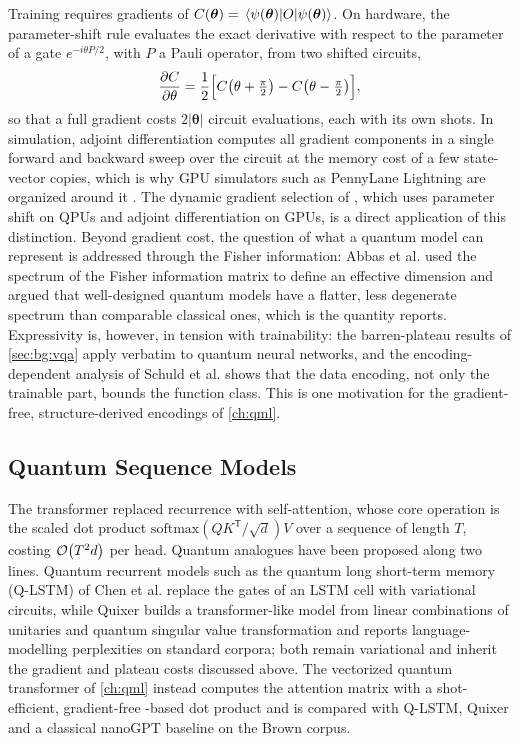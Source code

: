 Training requires gradients of $C(\bm{\theta})=\expval{O}{\psi(\bm{\theta})}$. On hardware, the parameter-shift rule \cite{crooks2019parametershift} evaluates the exact derivative with respect to the parameter of a gate $e^{-i\theta P/2}$, with $P$ a Pauli operator, from two shifted circuits,
\begin{equation}\label{eq:bg:paramshift}
\frac{\partial C}{\partial\theta}=\frac12\Bigl[C\bigl(\theta+\tfrac{\pi}{2}\bigr)-C\bigl(\theta-\tfrac{\pi}{2}\bigr)\Bigr],
\end{equation}
so that a full gradient costs $2|\bm{\theta}|$ circuit evaluations, each with its own shots. In simulation, adjoint differentiation \cite{jones2020adjoint} computes all gradient components in a single forward and backward sweep over the circuit at the memory cost of a few state-vector copies, which is why GPU simulators such as PennyLane Lightning are organized around it \cite{asadi2024pennylanelightning}. The dynamic gradient selection of \qpie{} \cite{guo2025qpie}, which uses parameter shift on QPUs and adjoint differentiation on GPUs, is a direct application of this distinction. Beyond gradient cost, the question of what a quantum model can represent is addressed through the Fisher information: Abbas et al. \cite{abbas2021power} used the spectrum of the Fisher information matrix to define an effective dimension and argued that well-designed quantum models have a flatter, less degenerate spectrum than comparable classical ones, which is the quantity \qpie{} reports. Expressivity is, however, in tension with trainability: the barren-plateau results of \cref{sec:bg:vqa} \cite{mcclean2018barren,holmes2022expressibility} apply verbatim to quantum neural networks, and the encoding-dependent analysis of Schuld et al. \cite{schuld2021dataencoding} shows that the data encoding, not only the trainable part, bounds the function class. This is one motivation for the gradient-free, structure-derived encodings of \cref{ch:qml}.

\subsection{Quantum Sequence Models}

The transformer \cite{vaswani2017attention} replaced recurrence with self-attention, whose core operation is the scaled dot product $\mathrm{softmax}(QK^{\mathsf{T}}/\sqrt{d})V$ over a sequence of length $T$, costing $\mathcal{O}\!\left(T^2d\right)$ per head. Quantum analogues have been proposed along two lines. Quantum recurrent models such as the quantum long short-term memory (Q-LSTM) of Chen et al. \cite{chen2022qlstm} replace the gates of an LSTM cell with variational circuits, while Quixer \cite{khatri2024quixer} builds a transformer-like model from linear combinations of unitaries and quantum singular value transformation and reports language-modelling perplexities on standard corpora; both remain variational and inherit the gradient and plateau costs discussed above. The vectorized quantum transformer of \cref{ch:qml} \cite{guo2025vqt} instead computes the attention matrix with a shot-efficient, gradient-free \qcrank{}-based dot product and is compared with Q-LSTM, Quixer and a classical nanoGPT baseline on the Brown corpus.

